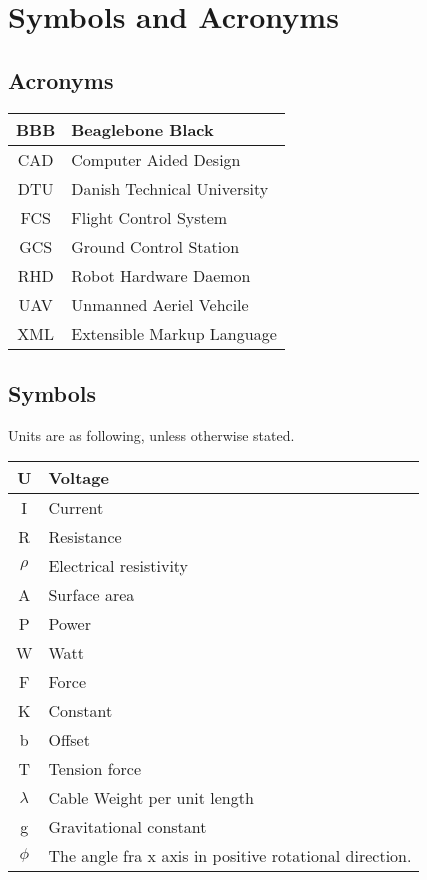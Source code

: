 \chapter{Symbols and Acronyms}
\section{Acronyms}
\begin{center}
\begin{tabular}{|c|l|}
\hline
BBB & Beaglebone Black \\ \hline
CAD & Computer Aided Design \\ \hline
DTU & Danish Technical University\\ \hline
FCS & Flight Control System \\ \hline
GCS & Ground Control Station \\ \hline
RHD & Robot Hardware Daemon \\ \hline
UAV & Unmanned Aeriel Vehcile \\ \hline
XML & Extensible Markup Language \\ \hline
\end{tabular}
\end{center}


\section{Symbols}
Units are as following, unless otherwise stated.
\begin{center}
\begin{tabular}{|c|l|}
\hline
U & Voltage \\ \hline
I & Current \\ \hline
R & Resistance \\ \hline
$\rho$ & Electrical resistivity \\ \hline
A & Surface area \\ \hline
P & Power\\ \hline
W & Watt \\ \hline
F & Force \\ \hline
K & Constant \\ \hline
b & Offset \\ \hline
T & Tension force \\ \hline
$\lambda$ & Cable Weight per unit length \\ \hline
g & Gravitational constant \\ \hline
$\phi$ & The angle fra x axis in positive rotational direction.\\ \hline
\end{tabular}
\end{center}
